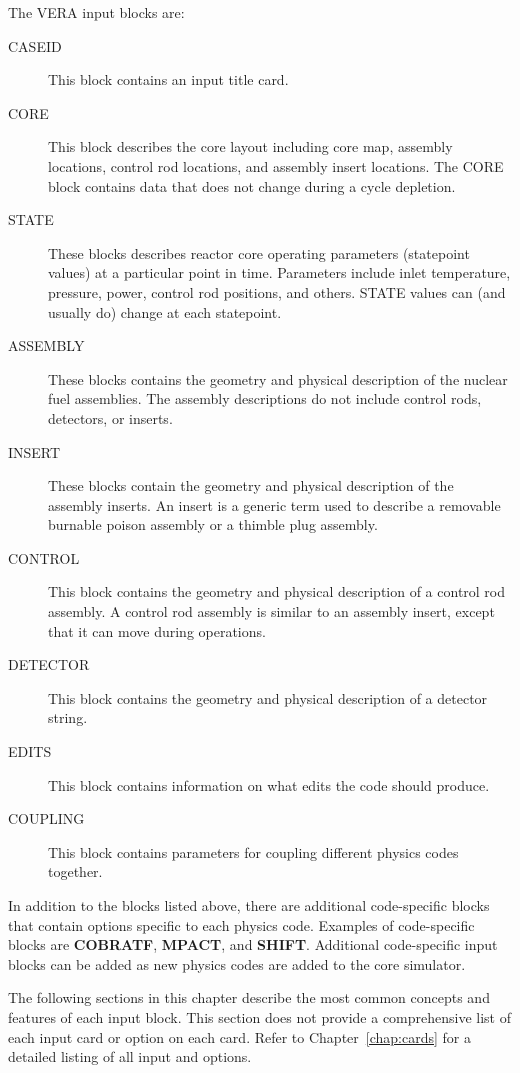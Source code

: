 \documentclass[11pt]{caslreport}
\begin{document}
The VERA input blocks are:
\begin{description}
\item[CASEID] This block contains an input title card.
\item[CORE] This block describes the core layout including core map, assembly locations,
  control rod locations, and assembly insert locations.  The CORE block contains data that does not change
  during a cycle depletion.
\item[STATE] These blocks describes reactor core operating parameters (statepoint values)
  at a particular point in time.
  Parameters include inlet temperature, pressure, power, control rod positions, and others.
  STATE values can (and usually do) change at each statepoint.
\item[ASSEMBLY] These blocks contains the geometry and physical description of the nuclear fuel assemblies.
  The assembly descriptions do not include control rods, detectors, or inserts.
\item[INSERT] These blocks contain the geometry and physical description of the assembly inserts.
   An insert is a generic term used to describe a removable burnable poison assembly or a thimble plug assembly.
\item[CONTROL] This block contains the geometry and physical description of a control rod assembly.
   A control rod assembly is similar to an assembly insert, except that it can move
   during operations.
\item[DETECTOR] This block contains the geometry and physical description of a detector string.
\item[EDITS] This block contains information on what edits the code should produce.
\item[COUPLING] This block contains parameters for coupling different physics codes together.
\end{description}

In addition to the blocks listed above, there are additional code-specific blocks that contain
options specific to each physics code.
Examples of code-specific blocks are {\bf COBRATF}, {\bf MPACT}, and {\bf SHIFT}.
Additional code-specific input blocks can be added as new physics codes are added to the core simulator.

The following sections in this chapter describe the most common concepts and features of each input block.
This section does not provide a comprehensive list of each input card or option on each card.
Refer to Chapter~\ref{chap:cards} for a detailed listing of all input and options.
\end{document}
